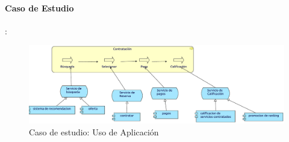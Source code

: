 \paragraph{Caso de Estudio}:

\begin{figure}[h!]
	\centering
	\includegraphics[width=\linewidth]{Desarrollo/ArquitecturaEmpresarial/Aplicacion/imgs/usoMetamodelo.pdf}
	\caption{Caso de estudio: Uso de Aplicación}
\end{figure}